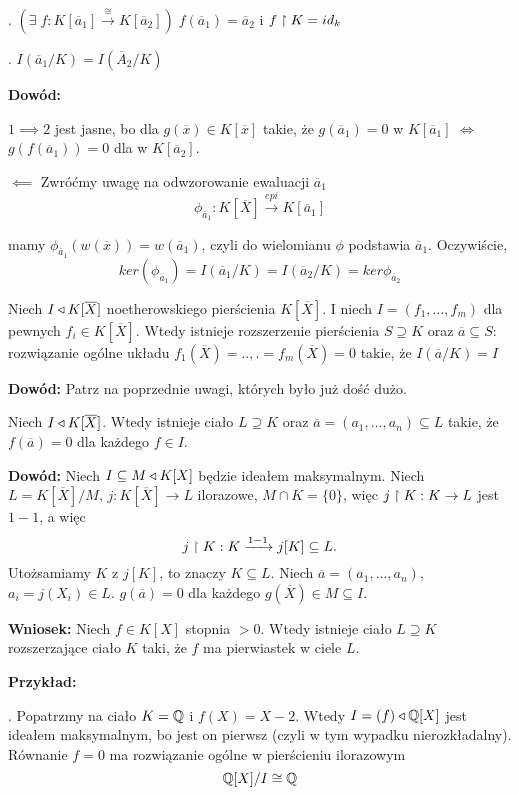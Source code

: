 . $(\exists\;f:K[\overline a_1]\xrightarrow[]{\cong}K[\overline a_2])\;f(\overline a_1)=\overline a_2$ i $f\upharpoonright K=id_k$

. $I(\overline a_1/K)=I(\overline A_2/K)$

\textbf{Dowód:}

$1\implies 2$ jest jasne, bo dla $g(\overline x)\in K[\overline x]$ takie, że $g(\overline a_1)=0$ w $K[\overline a_1]$ $\iff$ $g(f(\overline a_1))=0$ dla w $K[\overline a_2]$.

$\impliedby$ Zwróćmy uwagę na odwzorowanie ewaluacji $\overline a_1$
$$\phi_{\overline a_1}:K[\overline X]\xrightarrow[]{epi} K[\overline a_1]$$

mamy $\phi_{\overline a_1}(w(\overline x))=w(\overline a_1)$, czyli do wielomianu $\phi$ podstawia $\overline a_1$. Oczywiście, 
$$ker(\phi_{\overline a_1})=I(\overline a_1/K)=I(\overline a_2/K)=ker \phi_{\overline a_2}$$

 Niech $I\triangleleft K[\overline X]$ noetherowskiego pierścienia $K[\overline X]$. I niech $I=(f_1,...,f_m)$  dla pewnych $f_i\in K[\overline X]$. Wtedy istnieje rozszerzenie pierścienia $S\supseteq K$ oraz $\overline a\subseteq S$: rozwiązanie ogólne układu $f_1(\overline X)=..,.= f_m(\overline X)=0$ takie, że $I(\overline a/K)=I$

\textbf{Dowód:} Patrz na poprzednie uwagi, których było już dość dużo.

 Niech $I\triangleleft K[\overline X]$. Wtedy istnieje ciało $L\supseteq K$ oraz $\overline a=(a_1,...,a_n)\subseteq L$ takie, że $f(\overline a)=0$ dla każdego $f\in I$.

\textbf{Dowód:} Niech $I\subseteq M\triangleleft K[X]$ będzie ideałem maksymalnym. Niech $L=K[\overline X]/M$, $j:K[\overline X]\to L$ ilorazowe, $M\cap K=\{0\}$, więc $j\upharpoonright K:K\to L$ jest $1-1$, a więc
$$j\upharpoonright K:K\xrightarrow[]{1-1}j[K]\subseteq L.$$
Utożsamiamy $K$ z $j[K]$, to znaczy $K\subseteq L$. Niech $\overline a=(a_1,...,a_n)$, $a_i=j(X_i)\in L$. $g(\overline a)=0$ dla każdego $g(\overline X)\in M\subseteq I$.

\textbf{Wniosek:} Niech $f\in K[X]$ stopnia $>0$. Wtedy istnieje ciało $L\supseteq K$ rozszerzające ciało $K$ taki, że $f$ ma pierwiastek w ciele $L$.

\textbf{Przykład:} 

. Popatrzmy na ciało $K=\mathbb{Q}$ i $f(X)=X-2$. Wtedy $I=(f)\triangleleft \mathbb{Q}[X]$ jest ideałem maksymalnym, bo jest on pierwsz (czyli w tym wypadku nierozkładalny). Równanie $f=0$ ma rozwiązanie ogólne w pierścieniu ilorazowym
$$\mathbb{Q}[X]/I\cong \mathbb{Q}$$

